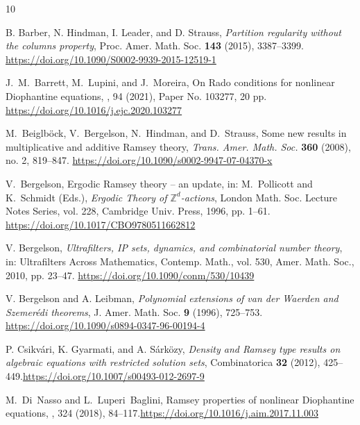 \documentclass{article}
\theoremstyle{Theorem}
\theoremstyle{definition}
\begin{document}
\begin{thebibliography}{10}

 B. Barber, N. Hindman, I. Leader, and D. Strauss, \textit{Partition regularity without the columns property}, Proc. Amer. Math. Soc. \textbf{143} (2015), 3387–3399. \href{https://doi.org/10.1090/S0002-9939-2015-12519-1}{https://doi.org/10.1090/S0002-9939-2015-12519-1}

J.~M.~Barrett, M.~Lupini, and J.~Moreira,
\newblock On Rado conditions for nonlinear Diophantine equations,
, 94 (2021), Paper No. 103277, 20 pp. \href{https://doi.org/10.1016/j.ejc.2020.103277}{https://doi.org/10.1016/j.ejc.2020.103277}

M.~Beiglböck, V.~Bergelson, N.~Hindman,  and D.~Strauss,
\newblock Some new results in multiplicative and additive Ramsey theory,
\newblock \emph{Trans. Amer. Math. Soc.} \textbf{360} (2008), no. 2, 819–847. \href{https://doi.org/10.1090/s0002-9947-07-04370-x }{https://doi.org/10.1090/s0002-9947-07-04370-x }

V.~Bergelson,
\newblock Ergodic Ramsey theory -- an update,
\newblock in: M.~Pollicott and K.~Schmidt (Eds.), \emph{Ergodic Theory of $\mathbb{Z}^d$-actions}, London Math. Soc. Lecture Notes Series, vol. 228, Cambridge Univ. Press, 1996, pp. 1--61. \href{https://doi.org/10.1017/CBO9780511662812}{https://doi.org/10.1017/CBO9780511662812}


 V. Bergelson, \textit{Ultrafilters, IP sets, dynamics, and combinatorial number theory}, in: Ultrafilters Across Mathematics, Contemp. Math., vol. 530, Amer. Math. Soc., 2010, pp. 23–47. \href{https://doi.org/10.1090/conm/530/10439 }{https://doi.org/10.1090/conm/530/10439 }

 V. Bergelson and A. Leibman, \textit{Polynomial extensions of van der Waerden and Szemerédi theorems}, J. Amer. Math. Soc. \textbf{9} (1996), 725–753. \href{https://doi.org/10.1090/s0894-0347-96-00194-4 }{https://doi.org/10.1090/s0894-0347-96-00194-4 }

 P. Csikv\'{a}ri, K. Gyarmati, and A. S\'{a}rk\"{o}zy, \textit{Density and Ramsey type results on algebraic equations with restricted solution sets}, Combinatorica \textbf{32} (2012), 425–449.\href{https://doi.org/10.1007/s00493-012-2697-9 }{https://doi.org/10.1007/s00493-012-2697-9 }

M.~Di~Nasso and L.~Luperi~Baglini,
\newblock Ramsey properties of nonlinear Diophantine equations,
, 324 (2018), 84--117.\href{https://doi.org/10.1016/j.aim.2017.11.003 }{https://doi.org/10.1016/j.aim.2017.11.003 }



\end{thebibliography}
\end{document}
